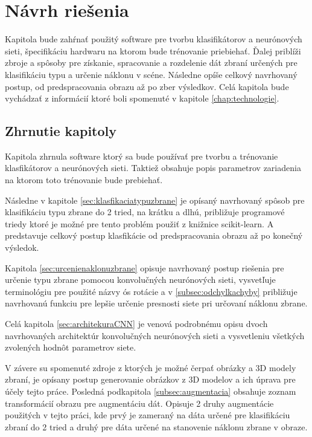 \chapter{Návrh riešenia}
Kapitola bude zahŕnať použitý software pre tvorbu klasifikátorov a neurónových sieti, špecifikáciu hardwaru na ktorom bude trénovanie priebiehať.
Ďalej priblíži zbroje a spôsoby pre získanie, spracovanie a rozdelenie dát zbraní určených pre klasifikáciu typu a určenie náklonu v scéne.
Následne opíše celkový navrhovaný postup, od predspracovania obrazu až po zber výsledkov.
Celá kapitola bude vychádzať z informácií ktoré boli spomenuté v kapitole \ref{chap:technologie}.












\section{Zhrnutie kapitoly}

Kapitola zhrnula software ktorý sa bude používať pre tvorbu a trénovanie klasfikátorov a neurónových sieti.
Taktiež obsahuje popis parametrov zariadenia na ktorom toto trénovanie bude prebiehať.

Následne v kapitole \ref{sec:klasfikaciatypuzbrane} je opísaný navrhovaný spôsob pre klasifikáciu typu zbrane do 2 tried, na krátku a dlhú, približuje
    programové triedy ktoré je možné pre tento problém použiť z knižnice scikit-learn.
A predstavuje celkový postup klasfikácie od predspracovania obrazu až po konečný výsledok.

Kapitola \ref{sec:urcenienaklonuzbrane} opisuje navrhovaný postup riešenia pre určenie typu zbrane pomocou konvolučných neurónových sieti,
    vysvetľuje terminológiu pre použité názvy ós rotácie a v \ref{subsec:odchylkachyby} približuje navrhovanú funkciu pre lepšie určenie presnosti siete
    pri určovaní náklonu zbrane.

Celá kapitola \ref{sec:architekuraCNN} je venová podrobnému opisu dvoch navrhovaných architektúr konvolučných neurónových sieti a
    vysvetleniu všetkých zvolených hodnôt parametrov siete.

V závere su spomenuté zdroje z ktorých je možné čerpať obrázky a 3D modely zbraní, je opísany postup generovanie obrázkov z 3D modelov a ich úprava
    pre účely tejto práce.
Posledná podkapitola \ref{subsec:augmentacia} obsahuje zoznam transformácií obrazu pre augmentáciu dát.
Opisuje 2 druhy augmentácie použitých v tejto práci, kde prvý je zameraný na dáta určené pre klasifikáciu zbraní do 2 tried a druhý pre dáta
    určené na stanovenie náklonu zbrane v obraze.
